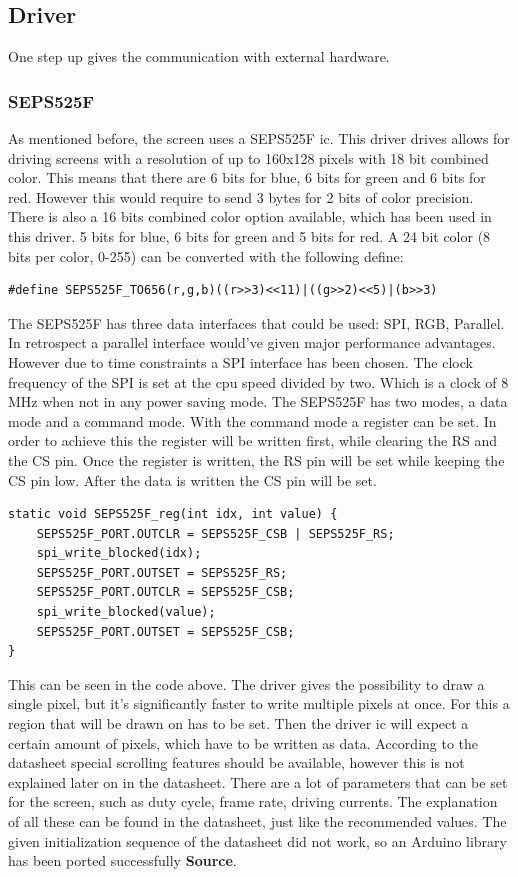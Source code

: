 \subsection{Driver}
One step up gives the communication with external hardware.
\subsubsection{SEPS525F}
As mentioned before, the screen uses a SEPS525F ic. This driver drives allows for driving screens with a resolution of up to 160x128 pixels with 18 bit combined color. This means that there are 6 bits for blue, 6 bits for green and 6 bits for red. However this would require to send 3 bytes for 2 bits of color precision. There is also a 16 bits combined color option available, which has been used in this driver. 5 bits for blue, 6 bits for green and 5 bits for red. A 24 bit color (8 bits per color, 0-255) can be converted with the following define:
\begin{verbatim}
#define SEPS525F_TO656(r,g,b)((r>>3)<<11)|((g>>2)<<5)|(b>>3)
\end{verbatim}
The SEPS525F has three data interfaces that could be used: SPI, RGB, Parallel. In retrospect a parallel interface would've given major performance advantages. However due to time constraints a SPI interface has been chosen. The clock frequency of the SPI is set at the cpu speed divided by two. Which is a clock of 8 MHz when not in any power saving mode.\newpar
The SEPS525F has two modes, a data mode and a command mode. With the command mode a register can be set. In order to achieve this the register will be written first, while clearing the RS and the CS pin. Once the register is written, the RS pin will be set while keeping the CS pin low. After the data is written the CS pin will be set.
\begin{verbatim}
static void SEPS525F_reg(int idx, int value) {
	SEPS525F_PORT.OUTCLR = SEPS525F_CSB | SEPS525F_RS;
	spi_write_blocked(idx);
	SEPS525F_PORT.OUTSET = SEPS525F_RS;
	SEPS525F_PORT.OUTCLR = SEPS525F_CSB;
	spi_write_blocked(value);
	SEPS525F_PORT.OUTSET = SEPS525F_CSB;
}
\end{verbatim}
This can be seen in the code above. The driver gives the possibility to draw a single pixel, but it's significantly faster to write multiple pixels at once. For this a region that will be drawn on has to be set. Then the driver ic will expect a certain amount of pixels, which have to be written as data. According to the datasheet special scrolling features should be available, however this is not explained later on in the datasheet. There are a lot of parameters that can be set for the screen, such as duty cycle, frame rate, driving currents. The explanation of all these can be found in the datasheet, just like the recommended values. The given initialization sequence of the datasheet did not work, so an Arduino library has been ported successfully \textbf{Source}.
